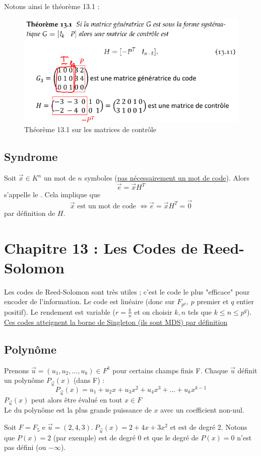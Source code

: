 \documentclass[11pt,a4paper]{article}
\begin{document}
	Notons ainsi le théorème 13.1 :
	\begin{figure}[!h]
		\centering
		\includegraphics[scale=0.8]{images/theo13_1}
		\caption{Théorème 13.1 sur les matrices de contrôle}
	\end{figure}

\subsection{Syndrome}
\label{syndrome}
Soit $\vec{x} \in K^n$ un mot de $n$ symboles (\uline{pas nécessairement un mot de code}). Alors 
\[\vec{e}=\vec{x}H^T\]
s'appelle le . Cela implique que
\[\vec{x} \text{ est un mot de code } \iff \vec{e} = \vec{x}H^T = \vec{0}\]
par définition de $H$.

\section[Codes de Reed-Solomon]{Chapitre 13 : Les Codes de Reed-Solomon}
Les codes de Reed-Solomon sont très utiles ; c'est le code le plus "efficace" pour encoder de l'information. Le code est linéaire (donc sur $F_{p^q},\ p$ premier et $q$ entier positif). Le rendement est variable ($r = \frac{k}{n}$ et on choisir $k,n$ tels que $k \leq n \leq p^q$). \uline{Ces codes atteignent \hyperref[Singleton]{la borne de Singleton} (ils sont MDS) par définition}
\subsection{Polynôme}
Prenons $\vec{u} = (u_1,u_2,\ldots,u_k) \in F^k$ pour certains champs finis F. Chaque $\vec{u}$ définit un polynôme $P_{\vec{u}}(x)$ (dans F) :
\begin{equation}
	P_{\vec{u}}(x) = u_1 + u_2x + u_3x^2 + u_4x^3 + \ldots + u_kx^{k-1}
	\label{P(u)}
\end{equation}
$P_{\vec{u}}(x)$ peut alors être évalué en tout $x \in F$\\
Le  du polynôme est la plus grande puissance de $x$ avec un coefficient non-nul.
\begin{exemple}
	Soit $F = F_5$ e $\vec{u} = (2,4,3).\ P_{\vec{u}}(x) = 2 + 4x + 3x^2$ et est de degré 2. Notons que $P(x) = 2$ (par exemple) est de degré 0 et que le degré de $P(x) = 0$ n'est pas défini (ou $-\infty$).
\end{exemple}
\end{document}
